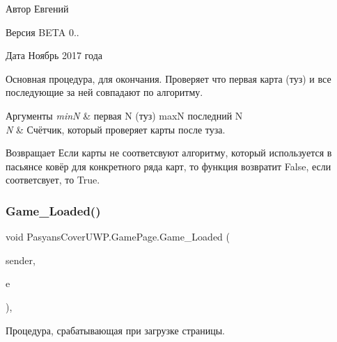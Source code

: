 \begin{DoxyAuthor}{Автор}
Евгений 
\end{DoxyAuthor}
\begin{DoxyVersion}{Версия}
B\+E\+TA 0.. 
\end{DoxyVersion}
\begin{DoxyDate}{Дата}
Ноябрь 2017 года
\end{DoxyDate}
Основная процедура, для окончания. Проверяет что первая карта (туз) и все последующие за ней совпадают по алгоритму. 
\begin{DoxyParams}{Аргументы}
{\em minN} & первая N (туз)  maxN последний N \\
\hline
{\em N} & Счётчик, который проверяет карты после туза. \\
\hline
\end{DoxyParams}
\begin{DoxyReturn}{Возвращает}
Если карты не соответсвуют алгоритму, который используется в пасьянсе ковёр для конкретного ряда карт, то функция возвратит False, если соответсвует, то True. 
\end{DoxyReturn}
\mbox{\label{class_pasyans_cover_u_w_p_1_1_game_page_ac8a85033f2127c25b60c0f0c82e7eefb}} 
\subsubsection{\texorpdfstring{Game\+\_\+\+Loaded()}{Game\_Loaded()}}
{\footnotesize\ttfamily void Pasyans\+Cover\+U\+W\+P.\+Game\+Page.\+Game\+\_\+\+Loaded (\begin{DoxyParamCaption}\item[{object}]{sender,  }\item[{Routed\+Event\+Args}]{e }\end{DoxyParamCaption})\hspace{0.3cm}{\ttfamily [inline]}, {\ttfamily [private]}}



Процедура, срабатывающая при загрузке страницы. 

